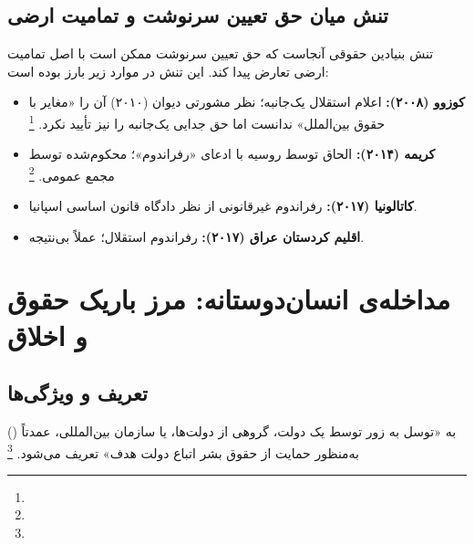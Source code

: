 \subsection{تنش میان حق تعیین سرنوشت و تمامیت ارضی}
\label{subsec:ch02-tension}

تنش بنیادین حقوقی آنجاست که حق تعیین سرنوشت ممکن است با اصل تمامیت ارضی تعارض پیدا کند. این تنش در موارد زیر بارز بوده است:

\begin{itemize}[nosep, rightmargin=1em]
  \item \textbf{کوزوو (۲۰۰۸):} اعلام استقلال یک‌جانبه؛ نظر مشورتی دیوان (۲۰۱۰) آن را «مغایر با حقوق بین‌الملل» ندانست اما حق جدایی یک‌جانبه را نیز تأیید نکرد.%
  \footnote{}
  \item \textbf{کریمه (۲۰۱۴):} الحاق توسط روسیه با ادعای «رفراندوم»؛ محکوم‌شده توسط مجمع عمومی.%
  \footnote{}
  \item \textbf{کاتالونیا (۲۰۱۷):} رفراندوم غیرقانونی از نظر دادگاه قانون اساسی اسپانیا.
  \item \textbf{اقلیم کردستان عراق (۲۰۱۷):} رفراندوم استقلال؛ عملاً بی‌نتیجه.
\end{itemize}

\section{مداخله‌ی انسان‌دوستانه: مرز باریک حقوق و اخلاق}
\label{sec:ch02-humanitarian}

\subsection{تعریف و ویژگی‌ها}
\label{subsec:ch02-hum-def}

 () به «توسل به زور توسط یک دولت، گروهی از دولت‌ها، یا سازمان بین‌المللی، عمدتاً به‌منظور حمایت از حقوق بشر اتباع دولت هدف» تعریف می‌شود.%
\footnote{}


